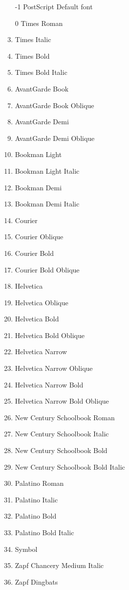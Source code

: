 \documentclass[10pt, a4paper]{article}
\begin{document}
\begin{enumerate}
\item[-1] PostScript Default font
\item[0]  Times Roman
\item     Times Italic
\item     Times Bold
\item     Times Bold Italic
\item     AvantGarde Book
\item     AvantGarde Book Oblique
\item     AvantGarde Demi
\item     AvantGarde Demi Oblique
\item     Bookman Light
\item     Bookman Light Italic
\item     Bookman Demi
\item     Bookman Demi Italic
\item     Courier
\item     Courier Oblique
\item     Courier Bold
\item     Courier Bold Oblique
\item     Helvetica
\item     Helvetica Oblique
\item     Helvetica Bold
\item     Helvetica Bold Oblique
\item     Helvetica Narrow
\item     Helvetica Narrow Oblique
\item     Helvetica Narrow Bold
\item     Helvetica Narrow Bold Oblique
\item     New Century Schoolbook Roman
\item     New Century Schoolbook Italic
\item     New Century Schoolbook Bold
\item     New Century Schoolbook Bold Italic
\item     Palatino Roman
\item     Palatino Italic
\item     Palatino Bold
\item     Palatino Bold Italic
\item     Symbol
\item     Zapf Chancery Medium Italic
\item     Zapf Dingbats
\end{enumerate}
      
\end{document}
